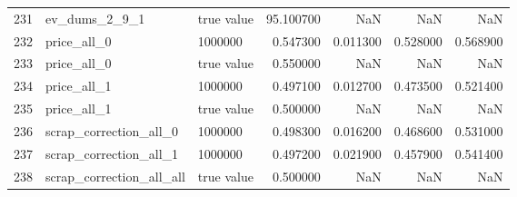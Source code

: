 \begin{tabular}{lllrrrr}
231 & ev_dums_2_9_1 & true value & 95.100700 & NaN & NaN & NaN \\
232 & price_all_0 & 1000000 & 0.547300 & 0.011300 & 0.528000 & 0.568900 \\
233 & price_all_0 & true value & 0.550000 & NaN & NaN & NaN \\
234 & price_all_1 & 1000000 & 0.497100 & 0.012700 & 0.473500 & 0.521400 \\
235 & price_all_1 & true value & 0.500000 & NaN & NaN & NaN \\
236 & scrap_correction_all_0 & 1000000 & 0.498300 & 0.016200 & 0.468600 & 0.531000 \\
237 & scrap_correction_all_1 & 1000000 & 0.497200 & 0.021900 & 0.457900 & 0.541400 \\
238 & scrap_correction_all_all & true value & 0.500000 & NaN & NaN & NaN \\
\bottomrule
\end{tabular}

